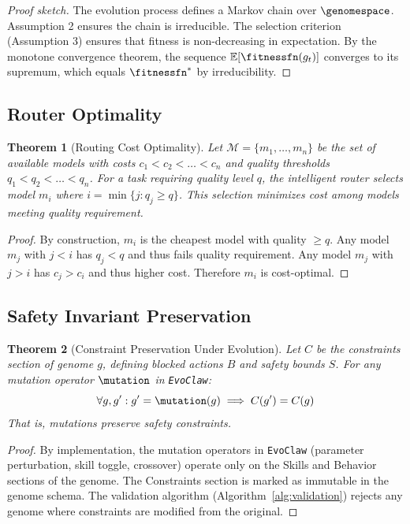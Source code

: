 \documentclass{article}
\newcommand{\evoclaw}{\texttt{EvoClaw}\xspace}
\newtheorem{theorem}{Theorem}[section]
\begin{document}
\begin{proof}[Proof sketch]
The evolution process defines a Markov chain over $\genomespace$. Assumption 2 ensures the chain is irreducible. The selection criterion (Assumption 3) ensures that fitness is non-decreasing in expectation. By the monotone convergence theorem, the sequence $\mathbb{E}[\fitnessfn(g_t)]$ converges to its supremum, which equals $\fitnessfn^*$ by irreducibility.
\end{proof}

\subsection{Router Optimality}

\begin{theorem}[Routing Cost Optimality]
Let $\mathcal{M} = \{m_1, \ldots, m_n\}$ be the set of available models with costs $c_1 < c_2 < \ldots < c_n$ and quality thresholds $q_1 < q_2 < \ldots < q_n$. For a task requiring quality level $q$, the intelligent router selects model $m_i$ where $i = \min\{j : q_j \geq q\}$. This selection minimizes cost among models meeting quality requirement.
\end{theorem}

\begin{proof}
By construction, $m_i$ is the cheapest model with quality $\geq q$. Any model $m_j$ with $j < i$ has $q_j < q$ and thus fails quality requirement. Any model $m_j$ with $j > i$ has $c_j > c_i$ and thus higher cost. Therefore $m_i$ is cost-optimal.
\end{proof}

\subsection{Safety Invariant Preservation}

\begin{theorem}[Constraint Preservation Under Evolution]
Let $C$ be the constraints section of genome $g$, defining blocked actions $B$ and safety bounds $S$. For any mutation operator $\mutation$ in \evoclaw{}:
\begin{equation}
\forall g, g' : g' = \mutation(g) \implies C(g') = C(g)
\end{equation}
That is, mutations preserve safety constraints.
\end{theorem}

\begin{proof}
By implementation, the mutation operators in \evoclaw{} (parameter perturbation, skill toggle, crossover) operate only on the Skills and Behavior sections of the genome. The Constraints section is marked as immutable in the genome schema. The validation algorithm (Algorithm~\ref{alg:validation}) rejects any genome where constraints are modified from the original.
\end{proof}
\end{document}
